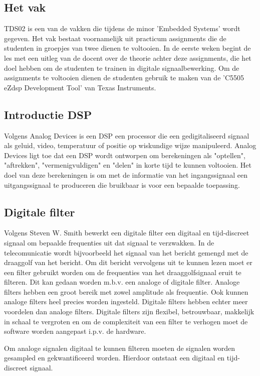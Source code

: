 \documentclass[11pt,a4paper]{article}
\begin{document}
		\subsection{Het vak}
		TDS02 is een van de vakken die tijdens de minor 'Embedded Systems' wordt gegeven. Het vak bestaat voornamelijk uit practicum assignments die de studenten in groepjes van twee dienen te voltooien. In de eerste weken begint de les met een uitleg van de docent over de theorie achter deze assignments, die het doel hebben om de studenten te trainen in digitale signaalbewerking. Om de assignments te voltooien dienen de studenten gebruik te maken van de 'C5505 eZdsp Development Tool' van Texas Instruments.
		
		\subsection{Introductie DSP}
		Volgens Analog Devices \cite{analog} is een DSP een processor die een gedigitaliseerd signaal als geluid, video, temperatuur of positie op wiskundige wijze manipuleerd. Analog Devices ligt toe dat een DSP wordt ontworpen om berekeningen als "optellen", "aftrekken", "vermenigvuldigen" en "delen" in korte tijd te kunnen voltooien. Het doel van deze berekeningen is om met de informatie van het ingangssignaal een uitgangssignaal te produceren die bruikbaar is voor een bepaalde toepassing. 
		
		\subsection{Digitale filter}
		Volgens Steven W. Smith \cite{DSPguide} bewerkt een digitale filter een digitaal en tijd-discreet signaal om bepaalde frequenties uit dat signaal te verzwakken. In de telecomunicatie wordt bijvoorbeeld het signaal van het bericht gemengd met de draaggolf van het bericht. Om dit bericht vervolgens uit te kunnen lezen moet er een filter gebruikt worden om de frequenties van het draaggolfsignaal eruit te filteren. Dit kan gedaan worden m.b.v. een analoge of digitale filter. Analoge filters hebben een groot bereik met zowel amplitude als frequentie. Ook kunnen analoge filters heel precies worden ingesteld. Digitale filters hebben echter meer voordelen dan analoge filters. Digitale filters zijn flexibel, betrouwbaar, makkelijk in schaal te vergroten en om de complexiteit van een filter te verhogen moet de software worden aangepast i.p.v. de hardware. 
		
Om analoge signalen digitaal te kunnen filteren moeten de signalen worden gesampled en gekwantificeerd worden. Hierdoor ontstaat een digitaal en tijd-discreet signaal. 
\end{document}
